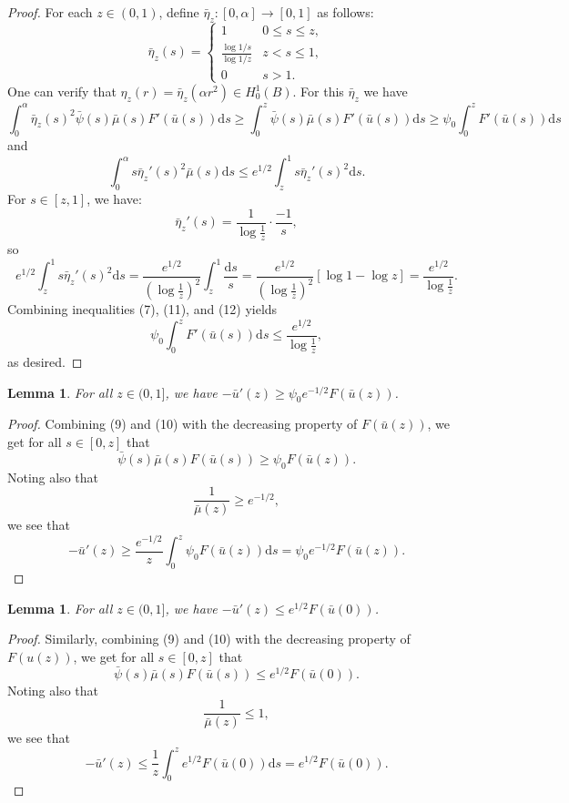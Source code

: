 \documentclass{article}
\newtheorem{lem}[thm]{Lemma}
\begin{document}
\begin{proof}
    For each $z\in (0,1)$, define $\bar\eta_z:[0,\alpha]\to[0,1]$ as follows:
    \[\bar\eta_z(s) = \begin{cases}
        1 & 0\leq s\leq z, \\
        \frac{\log 1/s}{\log 1/z} & z<s\leq 1, \\
        0 & s > 1.
    \end{cases}\]
    One can verify that $\eta_z(r)=\bar\eta_z(\alpha r^2)\in H_0^1(B)$. For this $\bar\eta_z$ we have
    \begin{equation}
        \int_0^\alpha \bar\eta_z(s)^2\bar\psi(s)\bar\mu(s)F'(\bar u(s))\mathrm{d}s\geq \int_0^z\bar\psi(s)\bar\mu(s)F'(\bar u(s))\mathrm{d}s\geq \psi_0\int_0^z F'(\bar u(s))\mathrm{d}s
    \end{equation}
    and
    \begin{equation}
        \int_0^\alpha s\bar\eta_z'(s)^2\bar\mu(s)\mathrm{d}s\leq e^{1/2}\int_z^1 s\bar\eta_z'(s)^2\mathrm{d}s.
    \end{equation}
    For $s\in[z,1]$, we have:
    \[\bar\eta_z'(s) = \frac 1{\log \frac 1z}\cdot \frac{-1}s,\]
    so
    \[e^{1/2}\int_z^1 s\bar\eta_z'(s)^2\mathrm{d}s = \frac {e^{1/2}}{\left(\log\frac 1z\right)^2}\int_z^1 \frac{\mathrm{d}s}s = \frac {e^{1/2}}{\left(\log\frac 1z\right)^2}[\log 1 - \log z] = \frac{e^{1/2}}{\log\frac 1z}.\]
    Combining inequalities (7), (11), and (12) yields
    \[\psi_0\int_0^z F'(\bar u(s))\mathrm{d}s \leq \frac{e^{1/2}}{\log \frac 1z},\]
    as desired.
\end{proof}
\begin{lem}
    For all $z\in(0,1]$, we have $-\bar u'(z)\geq \psi_0e^{-1/2}F(\bar u(z))$.
\end{lem}
\begin{proof}
    Combining (9) and (10) with the decreasing property of $F(\bar u(z))$, we get for all $s\in[0,z]$ that
    \[\bar\psi(s)\bar\mu(s)F(\bar u(s)) \geq \psi_0F(\bar u(z)).\]
    Noting also that
    \[\frac 1{\bar\mu(z)}\geq e^{-1/2},\]
    we see that
    \[-\bar u'(z) \geq \frac {e^{-1/2}}z\int_0^z \psi_0F(\bar u(z))\mathrm{d}s = \psi_0e^{-1/2}F(\bar u(z)).\]
\end{proof}
\begin{lem}
    For all $z\in(0,1]$, we have $-\bar u'(z)\leq e^{1/2}F(\bar u(0))$.
\end{lem}
\begin{proof}
    Similarly, combining (9) and (10) with the decreasing property of $F(u(z))$, we get for all $s\in[0,z]$ that
    \[\bar\psi(s)\bar\mu(s)F(\bar u(s)) \leq e^{1/2}F(\bar u(0)).\]
    Noting also that
    \[\frac 1{\bar\mu(z)}\leq 1,\]
    we see that
    \[-\bar u'(z)\leq \frac 1z\int_0^z e^{1/2}F(\bar u(0))\textrm{d}s = e^{1/2}F(\bar u(0)).\]
\end{proof}
\end{document}
